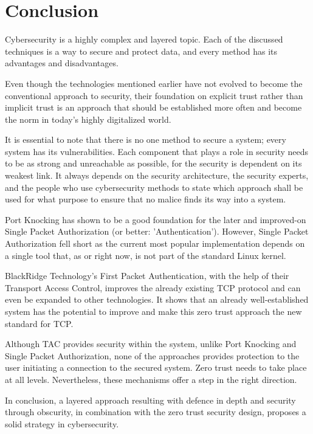 \section{Conclusion}
\label{sec:conclusion}

Cybersecurity is a highly complex and layered topic.  Each of the discussed techniques is a way to secure and protect data, and every method has its advantages and disadvantages.  \par

Even though the technologies mentioned earlier have not evolved to become the conventional approach to security, their foundation on explicit trust rather than implicit trust is an approach that should be established more often and become the norm in today's highly digitalized world.  \par
It is essential to note that there is no one method to secure a system; every system has its vulnerabilities. Each component that plays a role in security needs to be as strong and unreachable as possible, for the security is dependent on its weakest link.  It always depends on the security architecture, the security experts, and the people who use cybersecurity methods to state which approach shall be used for what purpose to ensure that no malice finds its way into a system.\\\par 

Port Knocking has shown to be a good foundation for the later and improved-on Single Packet Authorization (or better: 'Authentication'). However, Single Packet Authorization fell short as the current most popular implementation depends on a single tool that, as or right now, is not part of the standard Linux kernel.\par

BlackRidge Technology's First Packet Authentication, with the help of their Transport Access Control, improves the already existing TCP protocol and can even be expanded to other technologies. It shows that an already well-established system has the potential to improve and make this zero trust approach the new standard for TCP.\par

Although TAC provides security within the system, unlike Port Knocking and Single Packet Authorization, none of the approaches provides protection to the user initiating a connection to the secured system. Zero trust needs to take place at all levels. Nevertheless, these mechanisms offer a step in the right direction.\\\par

In conclusion, a layered approach resulting with defence in depth and security through obscurity, in combination with the zero trust security design, proposes a solid strategy in cybersecurity.\\\par
